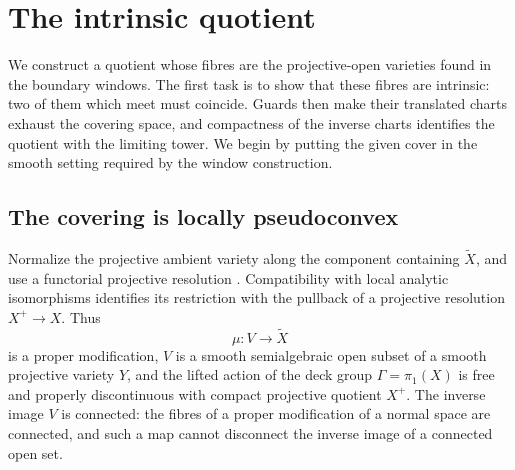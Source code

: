 \section{The intrinsic quotient}\label{quo:section}

We construct a quotient whose fibres are the projective-open varieties
found in the boundary windows. The first task is to show that these
fibres are intrinsic: two of them which meet must coincide. Guards
then make their translated charts exhaust the covering space, and
compactness of the inverse charts identifies the quotient with the
limiting tower. We begin by putting the given cover in the smooth
setting required by the window construction.

\subsection{The covering is locally pseudoconvex}

Normalize the projective ambient variety along the component containing
\(\widetilde X\), and use a functorial projective resolution
\cite[Theorem~1.1]{BierstoneMilman2008}.
Compatibility with local analytic isomorphisms identifies its restriction
with the pullback of a projective resolution \(X^+\to X\). Thus
\[
 \mu:V\longrightarrow\widetilde X
\]
is a proper modification, \(V\) is a smooth semialgebraic open subset
of a smooth projective variety \(Y\), and the lifted action of the
deck group \(\Gamma=\pi_1(X)\) is
free and properly discontinuous with compact projective quotient
\(X^+\). The inverse image \(V\) is connected: the fibres of a
proper modification of a normal space are connected, and such a map
cannot disconnect the inverse image of a connected open set.

